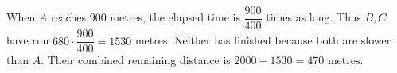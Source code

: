 When $A$ reaches 900 metres, the elapsed time is $\dfrac{900}{400}$ times as long. Thus $B,C$ have run $680\cdot\dfrac{900}{400}=1530$ metres. Neither has finished because both are slower than $A$. Their combined remaining distance is $2000-1530=\boxed{470\text{ metres}}$.
